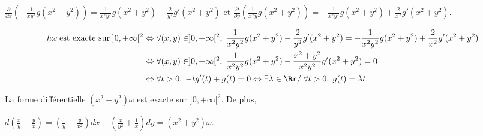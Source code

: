 {\begin{enumerate}
{$ \frac{\partial}{\partial x}\left(
- \frac{1}{xy^2}g(x^2+y^2)\right)= \frac{1}{x^2y^2}g(x^2+y^2)- \frac{2}{y^2}g'(x^2+y^2)$ et $ \frac{\partial}{\partial y}\left(
 \frac{1}{x^2y}g(x^2+y^2)\right)=- \frac{1}{x^2y^2}g(x^2+y^2)+ \frac{2}{x^2}g'(x^2+y^2)$.

\begin{align*}\ensuremath
h\omega\;\text{est exacte sur}\;]0,+\infty[^2&\Leftrightarrow\forall(x,y)\in]0,+\infty[^2,\; \frac{1}{x^2y^2}g(x^2+y^2)- \frac{2}{y^2}g'(x^2+y^2)=- \frac{1}{x^2y^2}g(x^2+y^2)+ \frac{2}{x^2}g'(x^2+y^2)\\
 &\Leftrightarrow\forall(x,y)\in]0,+\infty[^2,\; \frac{1}{x^2y^2}g(x^2+y^2)- \frac{x^2+y^2}{x^2y^2}g'(x^2+y^2)=0\\
 &\Leftrightarrow\forall t>0,\;-tg'(t)+g(t)=0\Leftrightarrow\exists \lambda\in\Rr/\;\forall t>0,\;g(t)=\lambda t.
\end{align*}

La forme différentielle $(x^2+y^2)\omega$ est exacte sur $]0,+\infty[^2$. De plus, 

\begin{center}
$d\left( \frac{x}{y}- \frac{y}{x}\right)=\left( \frac{1}{y}+ \frac{y}{x^2}\right)dx-\left( \frac{x}{y^2}+ \frac{1}{x}\right)dy=(x^2+y^2)\omega$.
\end{center}}
\end{enumerate}
}
